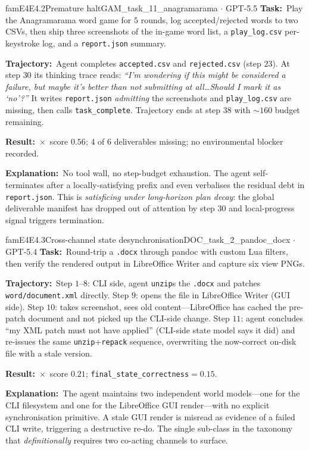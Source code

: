 \documentclass{llmxive}
\providecommand{\fbtask}[1]{\textbf{Task:}~#1\par\smallskip}
\providecommand{\fbtraj}[1]{\textbf{Trajectory:}~#1\par\smallskip}
\providecommand{\fbresult}[1]{\textbf{Result:}~#1\par\smallskip}
\providecommand{\fbexplain}[1]{\textbf{Explanation:}~#1}
\begin{document}
\begin{failbox}{famE4}{E4.2}{Premature halt}{GAM\_task\_11\_anagramarama \(\cdot\) GPT-5.5}
\fbtask{Play the Anagramarama word game for $5$ rounds, log accepted/rejected words to two CSVs, then ship three screenshots of the in-game word list, a \texttt{play\_log.csv} per-keystroke log, and a \texttt{report.json} summary.}
\fbtraj{Agent completes \texttt{accepted.csv} and \texttt{rejected.csv} (step $23$). At step $30$ its thinking trace reads: \emph{``I'm wondering if this might be considered a failure, but maybe it's better than not submitting at all\ldots Should I mark it as `no'?''} It writes \texttt{report.json} \emph{admitting} the screenshots and \texttt{play\_log.csv} are missing, then calls \texttt{task\_complete}. Trajectory ends at step $38$ with $\sim\!160$ budget remaining.}
\fbresult{$\times$~score $0.56$; $4$ of $6$ deliverables missing; no environmental blocker recorded.}
\fbexplain{No tool wall, no step-budget exhaustion. The agent self-terminates after a locally-satisfying prefix and even verbalises the residual debt in \texttt{report.json}. This is \emph{satisficing under long-horizon plan decay}: the global deliverable manifest has dropped out of attention by step $30$ and local-progress signal triggers termination.}
\end{failbox}

\begin{failbox}{famE4}{E4.3}{Cross-channel state desynchronisation}{DOC\_task\_2\_pandoc\_docx \(\cdot\) GPT-5.4}
\fbtask{Round-trip a \texttt{.docx} through pandoc with custom Lua filters, then verify the rendered output in LibreOffice Writer and capture six view PNGs.}
\fbtraj{Step $1$--$8$: CLI side, agent \texttt{unzip}s the \texttt{.docx} and patches \texttt{word/document.xml} directly. Step $9$: opens the file in LibreOffice Writer (GUI side). Step $10$: takes screenshot, sees old content---LibreOffice has cached the pre-patch document and not picked up the CLI-side change. Step $11$: agent concludes ``my XML patch must not have applied'' (CLI-side state model says it did) and re-issues the same \texttt{unzip}+\texttt{repack} sequence, overwriting the now-correct on-disk file with a stale version.}
\fbresult{$\times$~score $0.21$; \texttt{final\_state\_correctness}$=0.15$.}
\fbexplain{The agent maintains two independent world models---one for the CLI filesystem and one for the LibreOffice GUI render---with no explicit synchronisation primitive. A stale GUI render is misread as evidence of a failed CLI write, triggering a destructive re-do. The single sub-class in the taxonomy that \emph{definitionally} requires two co-acting channels to surface.}
\end{failbox}
\end{document}

